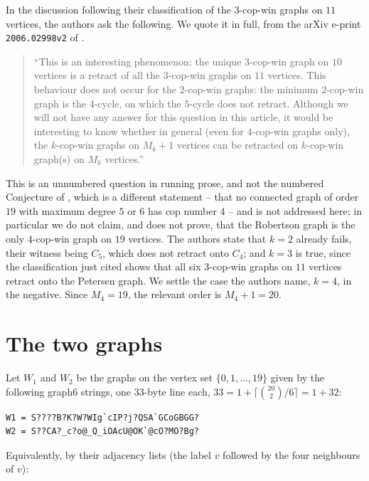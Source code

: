 \documentclass[11pt]{amsart}
\theoremstyle{remark}
\begin{document}
In the discussion following their classification of the $3$-cop-win graphs on $11$ vertices,
the authors ask the following. We quote it in full, from the arXiv e-print
\texttt{2006.02998v2} of \cite{TY}.

\begin{quote}
``This is an interesting phenomenon: the unique $3$-cop-win graph on $10$ vertices is a
retract of all the $3$-cop-win graphs on $11$ vertices. This behaviour does not occur for the
$2$-cop-win graphs: the minimum $2$-cop-win graph is the $4$-cycle, on which the $5$-cycle
does not retract. Although we will not have any answer for this question in this article, it
would be interesting to know whether in general (even for $4$-cop-win graphs only), the
$k$-cop-win graphs on $M_k+1$ vertices can be retracted on $k$-cop-win graph(s) on $M_k$
vertices.''
\end{quote}

This is an unnumbered question in running prose, and not the numbered Conjecture of \cite{TY},
which is a different statement -- that no connected graph of order $19$ with maximum degree $5$
or $6$ has cop number $4$ -- and is not addressed here; in particular we do not claim, and
\cite{TY} does not prove, that the Robertson graph is the only $4$-cop-win graph on $19$
vertices. The authors state that $k=2$ already fails, their witness being $C_5$, which does not
retract onto $C_4$; and $k=3$ is true, since the classification just cited shows that all six
$3$-cop-win graphs on $11$ vertices retract onto the Petersen graph. We settle the case the
authors name, $k=4$, in the negative. Since $M_4=19$, the relevant order is $M_4+1=20$.

\section{The two graphs}\label{sec:graphs}

Let $W_1$ and $W_2$ be the graphs on the vertex set $\{0,1,\dots,19\}$ given by the following
graph6 strings, one $33$-byte line each, $33=1+\lceil\binom{20}{2}/6\rceil=1+32$:

\begin{verbatim}
W1 = S????B?K?W?WIg`cIP?j?QSA`GCoGBGG?
W2 = S??CA?_c?o@_Q_iOAcU@OK`@cO?MO?Bg?
\end{verbatim}

\noindent
Equivalently, by their adjacency lists (the label $v$ followed by the four neighbours of $v$):
\end{document}
